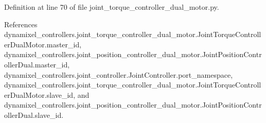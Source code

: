 Definition at line 70 of file joint\+\_\+torque\+\_\+controller\+\_\+dual\+\_\+motor.\+py.



References dynamixel\+\_\+controllers.\+joint\+\_\+torque\+\_\+controller\+\_\+dual\+\_\+motor.\+Joint\+Torque\+Controller\+Dual\+Motor.\+master\+\_\+id, dynamixel\+\_\+controllers.\+joint\+\_\+position\+\_\+controller\+\_\+dual\+\_\+motor.\+Joint\+Position\+Controller\+Dual.\+master\+\_\+id, dynamixel\+\_\+controllers.\+joint\+\_\+controller.\+Joint\+Controller.\+port\+\_\+namespace, dynamixel\+\_\+controllers.\+joint\+\_\+torque\+\_\+controller\+\_\+dual\+\_\+motor.\+Joint\+Torque\+Controller\+Dual\+Motor.\+slave\+\_\+id, and dynamixel\+\_\+controllers.\+joint\+\_\+position\+\_\+controller\+\_\+dual\+\_\+motor.\+Joint\+Position\+Controller\+Dual.\+slave\+\_\+id.


